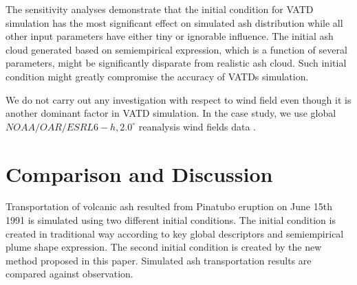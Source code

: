 \documentclass[draft,linenumbers]{agujournal2019}
\begin{document}
The sensitivity analyses demonstrate that the initial condition for VATD simulation has the most significant effect on simulated ash distribution while all other input parameters have either tiny or ignorable influence. The initial ash cloud generated based on semiempirical expression, which is a function of several parameters, might be significantly disparate from realistic ash cloud. Such initial condition might greatly compromise the accuracy of VATDs simulation.

We do not carry out any investigation with respect to wind field even though it is another dominant factor in VATD simulation. In the case study, we use global $NOAA/OAR/ESRL 6-h, 2.0^{\circ}$ reanalysis wind fields data \citep{whitaker2004reanalysis, compo2006feasibility, compo2011twentieth}.

\section{Comparison and Discussion}

Transportation of volcanic ash resulted from Pinatubo eruption on June 15th 1991 is simulated using two different initial conditions.
The initial condition is created in traditional way according to key global descriptors and semiempirical plume shape expression. The second initial condition is created by the new method proposed in this paper.  Simulated ash transportation results are compared against observation. 
\end{document}
